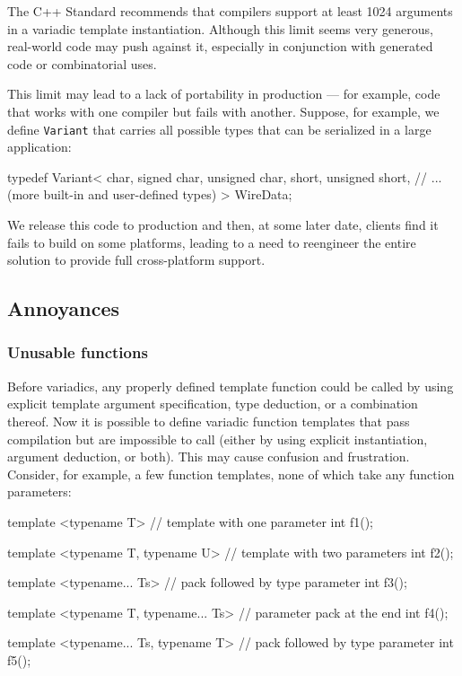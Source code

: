 The C++ Standard recommends that compilers support at least 1024
arguments in a variadic template instantiation. Although this limit
seems very generous, real-world code may push against it, especially in
conjunction with generated code or combinatorial uses.

This limit may lead to a lack of portability in production --- for
example, code that works with one compiler but fails with another.
Suppose, for example, we define \lstinline!Variant! that carries all
possible types that can be serialized in a large application:

\begin{emcppslisting}
typedef Variant<
    char,
    signed char,
    unsigned char,
    short,
    unsigned short,
    // ... (more built-in and user-defined types)
>
WireData;
\end{emcppslisting}
    

\noindent We release this code to production and then, at some later date, clients
find it fails to build on some platforms, leading to a need to
reengineer the entire solution to provide full cross-platform support.

\subsection[Annoyances]{Annoyances}\label{annoyances-variadic}

\subsubsection[Unusable functions]{Unusable functions}\label{unusable-functions}

Before variadics, any properly defined template function could be called
by using explicit template argument specification, type deduction, or a
combination thereof. Now it is possible to define variadic function
templates that pass compilation but are impossible to call (either by
using explicit instantiation, argument deduction, or both). This may
cause confusion and frustration. Consider, for example, a few function
templates, none of which take any function parameters:

\begin{emcppslisting}
template <typename T>                  // template with one parameter
int f1();

template <typename T, typename U>      // template with two parameters
int f2();

template <typename... Ts>              // pack followed by type parameter
int f3();

template <typename T, typename... Ts>  // parameter pack at the end
int f4();

template <typename... Ts, typename T>  // pack followed by type parameter
int f5();
\end{emcppslisting}
    

